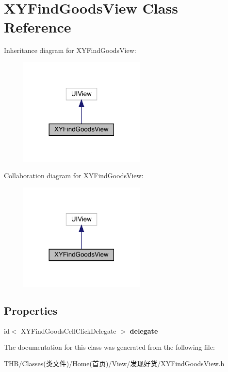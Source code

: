 \hypertarget{interface_x_y_find_goods_view}{}\section{X\+Y\+Find\+Goods\+View Class Reference}
\label{interface_x_y_find_goods_view}


Inheritance diagram for X\+Y\+Find\+Goods\+View\+:\nopagebreak
\begin{figure}[H]
\begin{center}
\leavevmode
\includegraphics[width=180pt]{interface_x_y_find_goods_view__inherit__graph}
\end{center}
\end{figure}


Collaboration diagram for X\+Y\+Find\+Goods\+View\+:\nopagebreak
\begin{figure}[H]
\begin{center}
\leavevmode
\includegraphics[width=180pt]{interface_x_y_find_goods_view__coll__graph}
\end{center}
\end{figure}
\subsection*{Properties}
\begin{DoxyCompactItemize}
\item 
\mbox{\label{interface_x_y_find_goods_view_a4d92f22bc71cad28dd4ed837718bf17e}} 
id$<$ X\+Y\+Find\+Goods\+Cell\+Click\+Delegate $>$ {\bfseries delegate}
\end{DoxyCompactItemize}


The documentation for this class was generated from the following file\+:\begin{DoxyCompactItemize}
\item 
T\+H\+B/\+Classes(类文件)/\+Home(首页)/\+View/发现好货/X\+Y\+Find\+Goods\+View.\+h\end{DoxyCompactItemize}
